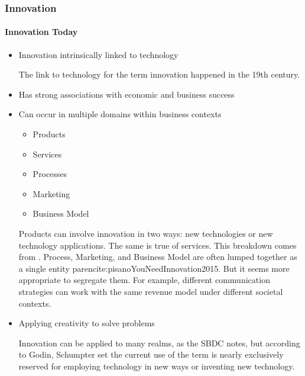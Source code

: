 \begin{frame}
  \frametitle{Innovation}
  \framesubtitle{Innovation Today}
  \begin{itemize}
    \item<1-> \alert { Innovation } intrinsically linked to technology

           {\scriptsize{The link to technology for the term innovation happened in the 19th century.}}

    \item<2-> Has strong associations with economic and business success
    \item<3-> Can occur in multiple domains within business contexts
          \begin{itemize}
            \item<4-> Products
            \item<4-> Services
            \item<4-> Processes
            \item<4-> Marketing
            \item<4-> Business Model
          \end{itemize}

           {\scriptsize{Products can involve innovation in two ways: new technologies or new technology applications. The same is true of services. This breakdown comes from \textcite{sbdcInnovationSmallBusiness2020}.}}
           {\scriptsize{Process, Marketing, and Business Model are often lumped together as a single entity  parencite:pisanoYouNeedInnovation2015. But it seems more appropriate to segregate them. For example, different communication strategies can work with the same revenue model under different societal contexts.}}

    \item<5-> Applying creativity to solve problems \parencite{godinInnovationContestedIdea2015}

           {\scriptsize{Innovation can be applied to many realms, as the SBDC notes, but according to Godin, Schumpter set the current use of the term is nearly exclusively reserved for employing technology in new ways or inventing new technology.}}
  \end{itemize}
\end{frame}
